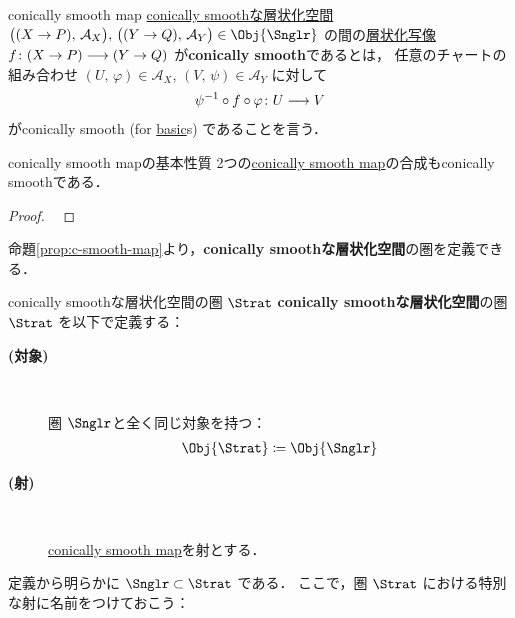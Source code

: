 \documentclass[TQFT_main]{subfiles}
\begin{document}
\begin{mydef}[label=def:c-smooth-map]{conically smooth map}
    \tcblower
    \hyperref[def:Snglr]{conically smoothな層状化空間} $\bigl( (X \to P),\, \mathcal{A}_X \bigr),\, \bigl( (Y \to Q),\, \mathcal{A}_Y \bigr) \in \Obj{\Snglr}$ の間の\hyperref[def:stratified-space]{層状化写像} $f \colon (X \to P) \longrightarrow (Y \to Q)$ が\textbf{conically smooth}であるとは，
    任意のチャートの組み合わせ $(U,\, \varphi) \in \mathcal{A}_X,\, (V,\, \psi) \in \mathcal{A}_Y$ に対して
    \begin{align}
        \psi^{-1} \circ f \circ \varphi \colon U \longrightarrow V
    \end{align}
    がconically smooth (for \hyperref[def:Snglr]{basic}s) であることを言う．
\end{mydef}

\begin{myprop}[label=prop:c-smooth-map]{conically smooth mapの基本性質}
    2つの\hyperref[def:c-smooth-map]{conically smooth map}の合成もconically smoothである．
\end{myprop}

\begin{proof}
    ~\cite[Proposition 3.3.5]{AFT2014stratified}
\end{proof}

命題\ref{prop:c-smooth-map}より，\textbf{conically smoothな層状化空間}の圏を定義できる．

\begin{mydef}[label=def:c-smooth]{conically smoothな層状化空間の圏 $\Strat$ }
    \textbf{conically smoothな層状化空間}の圏 $\Strat$ を以下で定義する：
    \begin{description}
        \item[\textbf{(対象)}]　
        
        圏 \hyperref[def:Snglr]{$\Snglr$}と全く同じ対象を持つ：
        \begin{align}
            \Obj{\Strat} \coloneqq \Obj{\Snglr}
        \end{align}
        \item[\textbf{(射)}]　
        
        \hyperref[def:c-smooth-map]{conically smooth map}を射とする．
    \end{description}
\end{mydef}

定義から明らかに $\Snglr \subset \Strat$ である．
ここで，圏 $\Strat$ における特別な射に名前をつけておこう：
\end{document}
